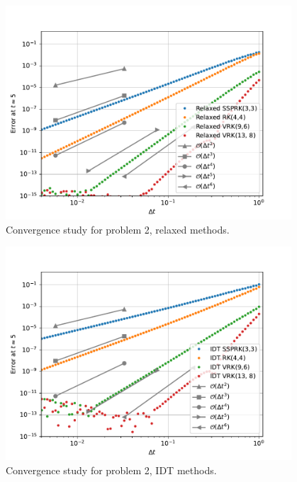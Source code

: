 \documentclass{report}
\begin{document}
    \begin{figure}[H]
        \centering
        \includegraphics[width=0.95\textwidth]{figs/P2_Relaxed_RK4.pdf}
        \caption{Convergence study for problem 2, relaxed methods.}
        \label{Fig4b}
    \end{figure}

    \begin{figure}[H]
        \centering
        \includegraphics[width=0.95\textwidth]{figs/P2_IDT_RK4.pdf}
        \caption{Convergence study for problem 2, IDT methods.}
        \label{Fig4c}
    \end{figure}
\end{document}
